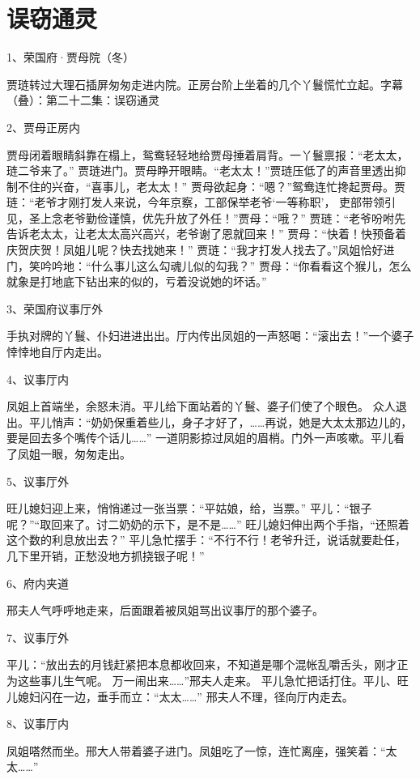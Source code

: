 \section*{误窃通灵}

1、荣国府·贾母院（冬）\par
贾琏转过大理石插屏匆匆走进内院。正房台阶上坐着的几个丫鬟慌忙立起。字幕（叠）：第二十二集：误窃通灵

2、贾母正房内\par
贾母闭着眼睛斜靠在榻上，鸳鸯轻轻地给贾母捶着肩背。一丫鬟禀报：“老太太，琏二爷来了。”
贾琏进门。贾母睁开眼睛。“老太太！”贾琏压低了的声音里透出抑制不住的兴奋，“喜事儿，老太太！”
贾母欲起身：“嗯？”鸳鸯连忙搀起贾母。贾琏：“老爷才刚打发人来说，今年京察，工部保举老爷‘一等称职’，
吏部带领引见，圣上念老爷勤俭谨慎，优先升放了外任！”贾母：“哦？”
贾琏：“老爷吩咐先告诉老太太，让老太太高兴高兴，老爷谢了恩就回来！”
贾母：“快着！快预备着庆贺庆贺！凤姐儿呢？快去找她来！”
贾琏：“我才打发人找去了。”凤姐恰好进门，笑吟吟地：“什么事儿这么勾魂儿似的勾我？”
贾母：“你看看这个猴儿，怎么就象是打地底下钻出来的似的，亏着没说她的坏话。”

3、荣国府议事厅外\par
手执对牌的丫鬟、仆妇进进出出。厅内传出凤姐的一声怒喝：“滚出去！”一个婆子悻悻地自厅内走出。

4、议事厅内\par
凤姐上首端坐，余怒未消。平儿给下面站着的丫鬟、婆子们使了个眼色。
众人退出。平儿悄声：“奶奶保重着些儿，身子才好了，……再说，她是大太太那边儿的，要是回去多个嘴传个话儿……”
一道阴影掠过凤姐的眉梢。门外一声咳嗽。平儿看了凤姐一眼，匆匆走出。

5、议事厅外\par
旺儿媳妇迎上来，悄悄递过一张当票：“平姑娘，给，当票。”
平儿：“银子呢？”“取回来了。讨二奶奶的示下，是不是……”
旺儿媳妇伸出两个手指，“还照着这个数的利息放出去？”
平儿急忙摆手：“不行不行！老爷升迁，说话就要赴任，几下里开销，正愁没地方抓挠银子呢！”

6、府内夹道\par
邢夫人气呼呼地走来，后面跟着被凤姐骂出议事厅的那个婆子。

7、议事厅外\par
平儿：“放出去的月钱赶紧把本息都收回来，不知道是哪个混帐乱嚼舌头，刚才正为这些事儿生气呢。
万一闹出来……”邢夫人走来。
平儿急忙把话打住。平儿、旺儿媳妇闪在一边，垂手而立：“太太……”
邢夫人不理，径向厅内走去。

8、议事厅内\par
凤姐嗒然而坐。邢大人带着婆子进门。凤姐吃了一惊，连忙离座，强笑着：“太太……”

